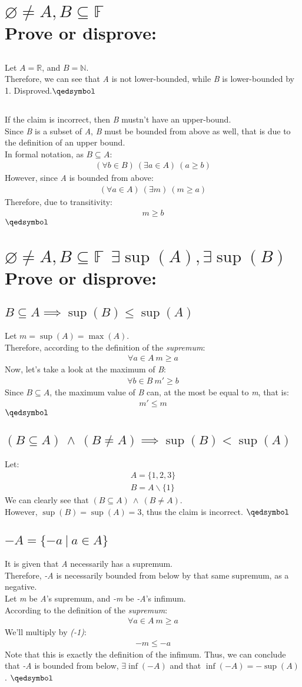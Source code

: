 \documentclass[a4paper, 12pt]{article}
\newcommand{\sub}[1]{\subsection{\underline{#1}}}
\newcommand{\R}{\ensuremath{\mathbb{R}}}
\newcommand{\F}{\ensuremath{\mathbb{F}}}
\newcommand{\N}{\ensuremath{\mathbb{N}}}
\newcommand{\eq}[1]{\begin{align*}#1\end{align*}}
\renewcommand{\qed}{\hfill\(\qedsymbol\)}
\begin{document}
\section{$\varnothing\neq A,B\subseteq\F$\\Prove or disprove:}
\sub{}
Let $A=\R$, and $B=\N$.\\
Therefore, we can see that \textit{A} is not lower-bounded, while \textit{B} is lower-bounded by 1.
Disproved.\qed
\sub{}
If the claim is incorrect, then \textit{B} mustn't have an upper-bound.\\
Since \textit{B} is a subset of \textit{A}, \textit{B} must be bounded from above as well, that is due to the definition of an upper bound.\\
In formal notation, as $B\subseteq{A}$:
\eq{(\forall{b}\in{B})~(\exists{a}\in{A})~(a\geq{b})}
However, since \textit{A} is bounded from above: \eq{(\forall{a}\in{A})~(\exists{m})~(m\geq{a})}
Therefore, due to transitivity: \eq{m\geq{b}}
\qed\pagebreak

\section{$\varnothing\neq A,B\subseteq\F~~\exists\sup(A),\exists\sup(B)$\\Prove or disprove:}
\sub{$B\subseteq{A} \implies \sup(B)\leq\sup(A)$}
Let $m=\sup(A)=\max(A)$.\\
Therefore, according to the definition of the \textit{supremum}:
\eq{\forall{a}\in{A}~m\geq{a}}
Now, let's take a look at the maximum of \textit{B}:
\eq{\forall{b}\in{B}~m'\geq{b}}
Since $B\subseteq{A}$, the maximum value of \textit{B} can, at the most be equal to \textit{m}, that is: \eq{m'\leq{m}}
\qed
\sub{$(B\subseteq{A})~\land~(B\neq{A})\implies \sup(B)<\sup(A)$}
Let: \eq{A=\{1,2,3\}\\B=A\backslash\{1\}}
We can clearly see that $(B\subseteq{A})~\land~(B\neq{A})$.\\
However, $\sup(B)=\sup(A)=3$, thus the claim is incorrect.
\qed
\sub{$-A=\{-a~|~a\in{A}\}$}
It is given that \textit{A} necessarily has a supremum.\\
Therefore, \textit{-A} is necessarily bounded from below by that same supremum, as a negative.\\
Let \textit{m} be \textit{A}'s supremum, and \textit{-m} be \textit{-A}'s infimum.\\
According to the definition of the \textit{supremum}:
\eq{\forall{a}\in{A}~m\geq{a}}
We'll multiply by \textit{(-1)}:
\eq{
    -m\leq{-a}
}
Note that this is exactly the definition of the infimum.
Thus, we can conclude that \textit{-A} is bounded from below, $\exists\inf(-A)$ and that $\inf(-A)=-\sup(A)$.
\qed\pagebreak
\end{document}
